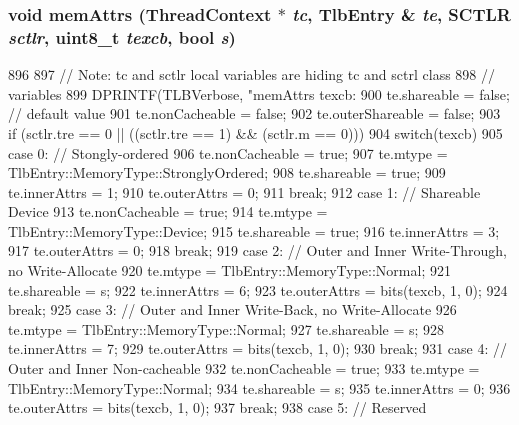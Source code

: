 \hypertarget{classArmISA_1_1TableWalker_a43ff5c97155cc958074f6212824d8890}{
\subsubsection[{memAttrs}]{\setlength{\rightskip}{0pt plus 5cm}void memAttrs ({\bf ThreadContext} $\ast$ {\em tc}, \/  {\bf TlbEntry} \& {\em te}, \/  SCTLR {\em sctlr}, \/  uint8\_\-t {\em texcb}, \/  bool {\em s})}}
\label{classArmISA_1_1TableWalker_a43ff5c97155cc958074f6212824d8890}



\begin{DoxyCode}
896 {
897     // Note: tc and sctlr local variables are hiding tc and sctrl class
898     // variables
899     DPRINTF(TLBVerbose, "memAttrs texcb:%
900     te.shareable = false; // default value
901     te.nonCacheable = false;
902     te.outerShareable = false;
903     if (sctlr.tre == 0 || ((sctlr.tre == 1) && (sctlr.m == 0))) {
904         switch(texcb) {
905           case 0: // Stongly-ordered
906             te.nonCacheable = true;
907             te.mtype = TlbEntry::MemoryType::StronglyOrdered;
908             te.shareable = true;
909             te.innerAttrs = 1;
910             te.outerAttrs = 0;
911             break;
912           case 1: // Shareable Device
913             te.nonCacheable = true;
914             te.mtype = TlbEntry::MemoryType::Device;
915             te.shareable = true;
916             te.innerAttrs = 3;
917             te.outerAttrs = 0;
918             break;
919           case 2: // Outer and Inner Write-Through, no Write-Allocate
920             te.mtype = TlbEntry::MemoryType::Normal;
921             te.shareable = s;
922             te.innerAttrs = 6;
923             te.outerAttrs = bits(texcb, 1, 0);
924             break;
925           case 3: // Outer and Inner Write-Back, no Write-Allocate
926             te.mtype = TlbEntry::MemoryType::Normal;
927             te.shareable = s;
928             te.innerAttrs = 7;
929             te.outerAttrs = bits(texcb, 1, 0);
930             break;
931           case 4: // Outer and Inner Non-cacheable
932             te.nonCacheable = true;
933             te.mtype = TlbEntry::MemoryType::Normal;
934             te.shareable = s;
935             te.innerAttrs = 0;
936             te.outerAttrs = bits(texcb, 1, 0);
937             break;
938           case 5: // Reserved
}}}
\end{DoxyCode}
